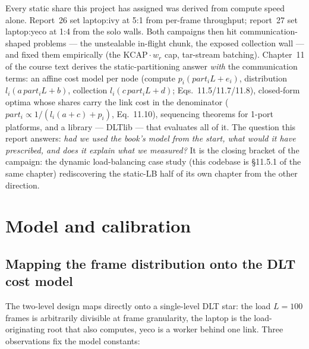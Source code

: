 \documentclass[
	english,
	letterpaper, oneside
]{article}
\begin{document}
Every static share this project has assigned was derived from compute
speed alone. Report~26 set laptop:ivy at 5:1 from per-frame throughput;
report~27 set laptop:yeco at 1:4 from the solo walls. Both campaigns then
hit communication-shaped problems --- the unstealable in-flight chunk, the
exposed collection wall --- and fixed them empirically (the
$\mathrm{KCAP}\cdot w_r$ cap, tar-stream batching). Chapter~11 of the
course text derives the static-partitioning answer \emph{with} the
communication terms: an affine cost model per node
(compute $p_i(part_i L + e_i)$, distribution $l_i(a\,part_i L + b)$,
collection $l_i(c\,part_i L + d)$; Eqs.~11.5/11.7/11.8), closed-form
optima whose shares carry the link cost in the denominator
($part_i \propto 1/(l_i(a{+}c) + p_i)$, Eq.~11.10), sequencing theorems
for 1-port platforms, and a library --- DLTlib --- that evaluates all of
it. The question this report answers: \emph{had we used the book's model
from the start, what would it have prescribed, and does it explain what we
measured?} It is the closing bracket of the campaign: the dynamic
load-balancing case study (this codebase is \S11.5.1 of the same chapter)
rediscovering the static-LB half of its own chapter from the other
direction.

\section{Model and calibration}
\label{sec:setup}

\subsection{Mapping the frame distribution onto the DLT cost model}

The two-level design maps directly onto a single-level DLT star: the load
$L=100$ frames is arbitrarily divisible at frame granularity, the laptop
is the load-originating root that also computes, yeco is a worker behind
one link. Three observations fix the model constants:
\end{document}
